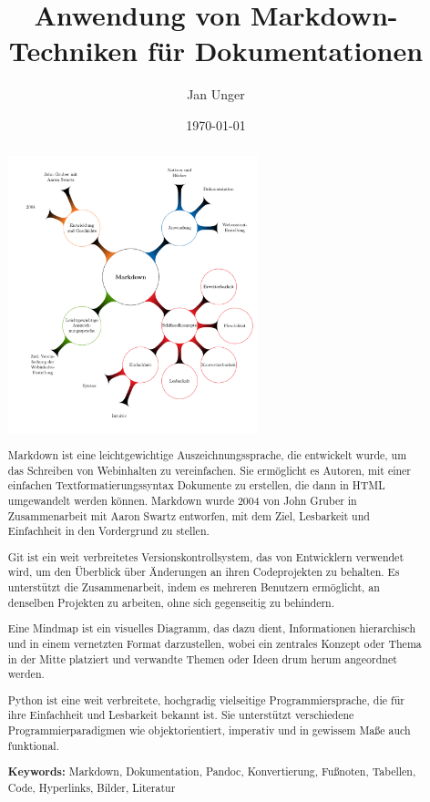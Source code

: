 \documentclass{vorlage-design-main}
\title{Anwendung von Markdown-Techniken für Dokumentationen}
\author{Jan Unger}
\date{\today}
\begin{document}
\maketitle

\begin{abstract}
\includegraphics[width=0.6\textwidth]{images/Mindmap-Markdown.pdf}

Markdown ist eine leichtgewichtige Auszeichnungssprache, die entwickelt
wurde, um das Schreiben von Webinhalten zu vereinfachen. Sie ermöglicht
es Autoren, mit einer einfachen Textformatierungssyntax Dokumente zu
erstellen, die dann in HTML umgewandelt werden können. Markdown wurde
2004 von John Gruber in Zusammenarbeit mit Aaron Swartz entworfen, mit
dem Ziel, Lesbarkeit und Einfachheit in den Vordergrund zu stellen.

Git ist ein weit verbreitetes Versionskontrollsystem, das von
Entwicklern verwendet wird, um den Überblick über Änderungen an ihren
Codeprojekten zu behalten. Es unterstützt die Zusammenarbeit, indem es
mehreren Benutzern ermöglicht, an denselben Projekten zu arbeiten, ohne
sich gegenseitig zu behindern.

Eine Mindmap ist ein visuelles Diagramm, das dazu dient, Informationen
hierarchisch und in einem vernetzten Format darzustellen, wobei ein
zentrales Konzept oder Thema in der Mitte platziert und verwandte Themen
oder Ideen drum herum angeordnet werden.

Python ist eine weit verbreitete, hochgradig vielseitige
Programmiersprache, die für ihre Einfachheit und Lesbarkeit bekannt ist.
Sie unterstützt verschiedene Programmierparadigmen wie objektorientiert,
imperativ und in gewissem Maße auch funktional.

\textbf{Keywords:} Markdown, Dokumentation, Pandoc, Konvertierung,
Fußnoten, Tabellen, Code, Hyperlinks, Bilder, Literatur
\end{abstract}
\end{document}
